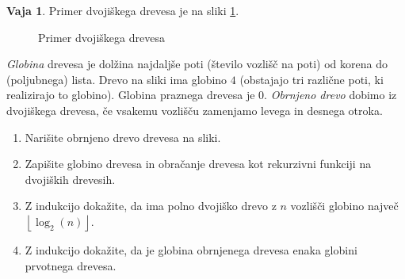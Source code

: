 \documentclass{article}
\theoremstyle{definition}
\newtheorem{vaja}{Vaja}
\begin{document}
\begin{vaja}
	Primer dvojiškega drevesa je na sliki \ref{fig:drevo}.

	\begin{figure}
		\centering
		\caption{Primer dvojiškega drevesa}
		\label{fig:drevo}
	\end{figure}


	
	
	\emph{Globina} drevesa je dolžina najdaljše poti (število vozlišč na poti) od korena do (poljubnega) lista. Drevo na sliki ima globino $4$ (obstajajo tri različne poti, ki realizirajo to globino). Globina praznega drevesa je 0.  
	\emph{Obrnjeno drevo} dobimo iz dvojiškega drevesa, če vsakemu vozlišču zamenjamo levega in desnega otroka. 
	\begin{enumerate}
		\item Narišite obrnjeno drevo drevesa na sliki.
		\item Zapišite globino drevesa in obračanje drevesa kot rekurzivni funkciji na dvojiških drevesih.
		\item Z indukcijo dokažite, da ima polno dvojiško drevo z $n$ vozlišči globino največ $\left \lfloor{ \log_2(n)}\right \rfloor $. 
		\item Z indukcijo dokažite, da je globina obrnjenega drevesa enaka globini prvotnega drevesa. 
	\end{enumerate}
\end{vaja}
\end{document}
